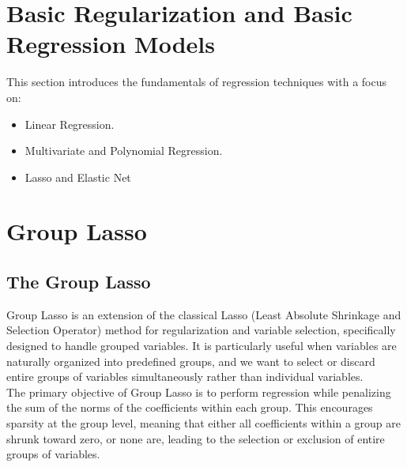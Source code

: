 \documentclass[a4paper, 12pt]{article}
\begin{document}
\section{Basic Regularization and Basic Regression Models}
\noindent
This section introduces the fundamentals of regression techniques with a focus on:
\begin{itemize}
    \item Linear Regression.
    \item Multivariate and Polynomial Regression.
    \item Lasso and Elastic Net
\end{itemize}

\section{Group Lasso}
\noindent

\subsection{The Group Lasso}
Group Lasso is an extension of the classical Lasso (Least Absolute Shrinkage and Selection Operator) method for regularization and variable selection, specifically designed to handle grouped variables. It is particularly useful when variables are naturally organized into predefined groups, and we want to select or discard entire groups of variables simultaneously rather than individual variables.\\
The primary objective of Group Lasso is to perform regression while penalizing the sum of the norms of the coefficients within each group. This encourages sparsity at the group level, meaning that either all coefficients within a group are shrunk toward zero, or none are, leading to the selection or exclusion of entire groups of variables.
\end{document}
